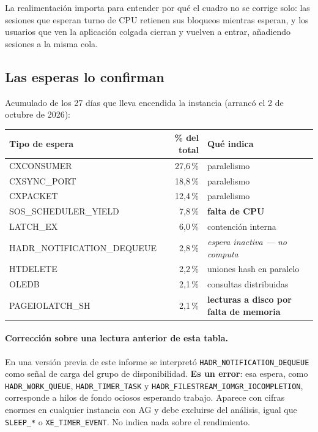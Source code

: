 \documentclass[11pt,a4paper]{article}
\newcommand{\cod}[1]{\texttt{\small #1}}
\newcommand{\critico}[1]{\textcolor{rojo}{\textbf{#1}}}
\newcommand{\sombra}{\cellcolor{grisclaro}}
\begin{document}
La realimentación importa para entender por qué el cuadro no se corrige solo:
las sesiones que esperan turno de CPU retienen sus bloqueos mientras esperan,
y los usuarios que ven la aplicación colgada cierran y vuelven a entrar,
añadiendo sesiones a la misma cola.

\subsection{Las esperas lo confirman}

Acumulado de los 27 días que lleva encendida la instancia (arrancó el 2 de
octubre de 2026):

\begin{table}[h]
\centering
\small
\begin{tabular}{lrl}
\toprule
\textbf{Tipo de espera} & \textbf{\% del total} & \textbf{Qué indica} \\
\midrule
CXCONSUMER                & 27,6\,\% & paralelismo \\
CXSYNC\_PORT              & 18,8\,\% & paralelismo \\
CXPACKET                  & 12,4\,\% & paralelismo \\
SOS\_SCHEDULER\_YIELD     &  7,8\,\% & \critico{falta de CPU} \\
LATCH\_EX                 &  6,0\,\% & contención interna \\
\sombra HADR\_NOTIFICATION\_DEQUEUE & \sombra 2,8\,\% &
  \sombra \emph{espera inactiva --- no computa} \\
HTDELETE                  &  2,2\,\% & uniones hash en paralelo \\
OLEDB                     &  2,1\,\% & consultas distribuidas \\
PAGEIOLATCH\_SH           &  2,1\,\% & \critico{lecturas a disco por falta de memoria} \\
\bottomrule
\end{tabular}
\end{table}

\paragraph{Corrección sobre una lectura anterior de esta tabla.} En una
versión previa de este informe se interpretó
\cod{HADR\_NOTIFICATION\_DEQUEUE} como señal de carga del grupo de
disponibilidad. \textbf{Es un error}: esa espera, como
\cod{HADR\_WORK\_QUEUE}, \cod{HADR\_TIMER\_TASK} y
\cod{HADR\_FILE\-STREAM\_IOMGR\_IOCOMPLETION}, corresponde a hilos de fondo
ociosos esperando trabajo. Aparece con cifras enormes en cualquier instancia
con AG y debe excluirse del análisis, igual que \cod{SLEEP\_*} o
\cod{XE\_TIMER\_EVENT}. No indica nada sobre el rendimiento.
\end{document}
